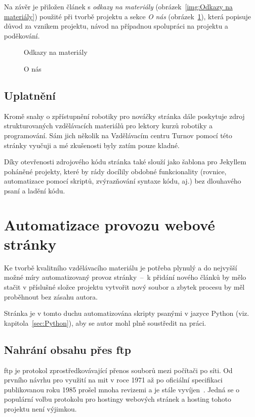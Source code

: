 \documentclass[a4paper, 12pt]{article}
\newcommand*{\fullref}[1]{\hyperref[{#1}]{\ref*{#1}}}
\begin{document}
  Na závěr je přiložen článek s \emph{odkazy na materiály} (obrázek~\ref{img:Odkazy na materiály}) použité při tvorbě projektu a sekce \emph{O nás} (obrázek~\ref{img:O nás}), která popisuje důvod za vznikem projektu, návod na případnou spolupráci na projektu a poděkování.

  \begin{figure}[H]
      \caption{Odkazy na materiály} \label{img:Odkazy na materiály}
    \endminipage\hfill
      \caption{O nás} \label{img:O nás}
    \endminipage
  \end{figure}


  \subsection{Uplatnění}
  Kromě snahy o zpřístupnění robotiky pro nováčky stránka dále poskytuje zdroj strukturovaných vzdělávacích materiálů pro lektory kurzů robotiky a programování. Sám jich několik na Vzdělávacím centru Turnov pomocí této stránky vyučuji a mé zkušenosti byly zatím pouze kladné.

  Díky otevřenosti zdrojového kódu stránka také slouží jako šablona pro Jekyllem poháněné projekty, které by rády docílily obdobné funkcionality (rovnice, automatizace pomocí skriptů, zvýrazňování syntaxe kódu, aj.) bez dlouhavého psaní a ladění kódu.


  \section{Automatizace provozu webové stránky} \label{sec:Automatizace provozu webové stránky}
  Ke tvorbě kvalitního vzdělávacího materiálu je potřeba plynulý a do nejvyšší možné míry automatizovaný provoz stránky~--~k přidání nového článků by mělo stačit v příslušné složce projektu vytvořit nový soubor a zbytek procesu by měl proběhnout bez zásahu autora.

  Stránka je v tomto duchu automatizována skripty psanými v jazyce Python (viz. kapitola~\fullref{sec:Python}), aby se autor mohl plně soustředit na práci.


  \subsection{Nahrání obsahu přes \acrshort{ftp}}
  \gls{ftp} je protokol zprostředkovávající přenos souborů mezi počítači po síti. Od prvního návrhu pro využití na \gls{mit} v roce 1971 až po oficiální specifikaci publikovanou roku 1985 prošel mnoha revizemi a je stále vyvíjen~\cite{ftp-specification}. Jedná se o populární volbu protokolu pro hostingy webových stránek a hosting tohoto projektu není výjimkou.
\end{document}
